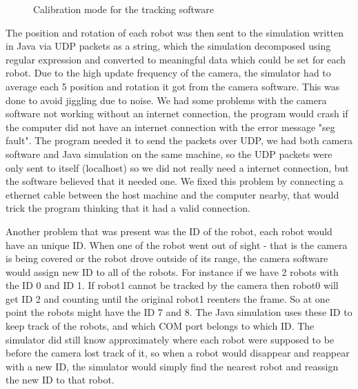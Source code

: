 \begin{figure}
     \hfill
    
            \caption[Calibrating colors]{Calibration mode for the tracking software}
            \label{fig:calibration}
\end{figure}
\newpage
The position and rotation of each robot was then sent to the simulation written in Java via UDP packets as a string, which the simulation decomposed using regular expression and converted to meaningful data which could be set for each robot. Due to the high update frequency of the camera, the simulator had to average each 5 position and rotation it got from the camera software. This was done to avoid jiggling due to noise. We had some problems with the camera software not working without an internet connection, the program would crash if the computer did not have an internet connection with the error message "seg fault". The program needed it to send the packets over UDP, we had both camera software and Java simulation on the same machine, so the UDP packets were only sent to itself (localhost) so we did not really need a internet connection, but the software believed that it needed one. We fixed this problem by connecting a ethernet cable between the host machine and the computer nearby, that would trick the program thinking that it had a valid connection.

Another problem that was present was the ID of the robot, each robot would have an unique ID. When one of the robot went out of sight - that is the camera is being covered or the robot drove outside of its range, the camera software would assign new ID to all of the robots. For instance if we have 2 robots with the ID 0 and ID 1. If robot1 cannot be tracked by the camera then robot0 will get ID 2 and counting until the original robot1 reenters the frame. So at one point the robots might have the ID 7 and 8. The Java simulation uses these ID to keep track of the robots, and which COM port belongs to which ID. The simulator did still know approximately where each robot were supposed to be before the camera lost track of it, so when a robot would disappear and reappear with a new ID, the simulator would simply find the nearest robot and reassign the new ID to that robot.


